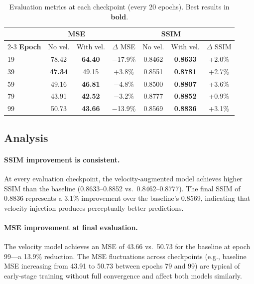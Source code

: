 \documentclass[11pt,a4paper]{article}
\begin{document}
\begin{table}[htbp]
\centering
\caption{Evaluation metrics at each checkpoint (every 20 epochs). Best results in \textbf{bold}.}
\begin{tabular}{lcccccc}
\toprule
 & \multicolumn{2}{c}{\textbf{MSE}} & & \multicolumn{2}{c}{\textbf{SSIM}} & \\
\cmidrule{2-3} \cmidrule{5-6}
\textbf{Epoch} & No vel. & With vel. & $\Delta$ MSE & No vel. & With vel. & $\Delta$ SSIM \\
\midrule
19 & 78.42 & \textbf{64.40} & $-$17.9\% & 0.8462 & \textbf{0.8633} & +2.0\% \\
39 & \textbf{47.34} & 49.15 & +3.8\% & 0.8551 & \textbf{0.8781} & +2.7\% \\
59 & 49.16 & \textbf{46.81} & $-$4.8\% & 0.8500 & \textbf{0.8807} & +3.6\% \\
79 & 43.91 & \textbf{42.52} & $-$3.2\% & 0.8777 & \textbf{0.8852} & +0.9\% \\
99 & 50.73 & \textbf{43.66} & $-$13.9\% & 0.8569 & \textbf{0.8836} & +3.1\% \\
\bottomrule
\end{tabular}
\label{tab:eval}
\end{table}

\subsection{Analysis}

\paragraph{SSIM improvement is consistent.} At every evaluation checkpoint, the velocity-augmented model achieves higher SSIM than the baseline (0.8633--0.8852 vs.\ 0.8462--0.8777). The final SSIM of 0.8836 represents a 3.1\% improvement over the baseline's 0.8569, indicating that velocity injection produces perceptually better predictions.

\paragraph{MSE improvement at final evaluation.} The velocity model achieves an MSE of 43.66 vs.\ 50.73 for the baseline at epoch 99---a 13.9\% reduction. The MSE fluctuations across checkpoints (e.g., baseline MSE increasing from 43.91 to 50.73 between epochs 79 and 99) are typical of early-stage training without full convergence and affect both models similarly.
\end{document}

